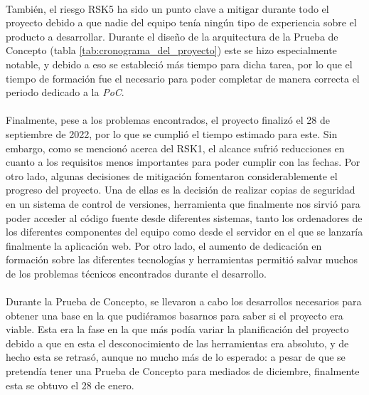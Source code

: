 \documentclass{subfiles}
\begin{document}
        \paragraph{}
        También, el riesgo RSK5 ha sido un punto clave a mitigar durante todo el proyecto debido a que nadie del equipo tenía ningún tipo de experiencia sobre el producto a desarrollar. Durante el diseño de la arquitectura de la Prueba de Concepto (tabla \ref{tab:cronograma_del_proyecto}) este se hizo especialmente notable, y debido a eso se estableció más tiempo para dicha tarea, por lo que el tiempo de formación fue el necesario para poder completar de manera correcta el periodo dedicado a la \textit{PoC}.

        \paragraph{}
        Finalmente, pese a los problemas encontrados, el proyecto finalizó el 28 de septiembre de 2022, por lo que se cumplió el tiempo estimado para este. Sin embargo, como se mencionó acerca del RSK1, el alcance sufrió reducciones en cuanto a los requisitos menos importantes para poder cumplir con las fechas. Por otro lado, algunas decisiones de mitigación fomentaron considerablemente el progreso del proyecto. Una de ellas es la decisión de realizar copias de seguridad en un sistema de control de versiones, herramienta que finalmente nos sirvió para poder acceder al código fuente desde diferentes sistemas, tanto los ordenadores de los diferentes componentes del equipo como desde el servidor en el que se lanzaría finalmente la aplicación web. Por otro lado, el aumento de dedicación en formación sobre las diferentes tecnologías y herramientas permitió salvar muchos de los problemas técnicos encontrados durante el desarrollo.

        \paragraph{}
        Durante la Prueba de Concepto, se llevaron a cabo los desarrollos necesarios para obtener una base en la que pudiéramos basarnos para saber si el proyecto era viable. Esta era la fase en la que más podía variar la planificación del proyecto debido a que en esta el desconocimiento de las herramientas era absoluto, y de hecho esta se retrasó, aunque no mucho más de lo esperado: a pesar de que se pretendía tener una Prueba de Concepto para mediados de diciembre, finalmente esta se obtuvo el 28 de enero.
\end{document}
